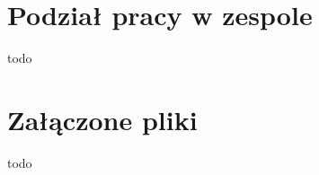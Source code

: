 \documentclass[licencjacka]{pracamgr}
\begin{document}
\chapter{Podział pracy w zespole}
todo

\chapter{Załączone pliki}
todo

\end{document}
